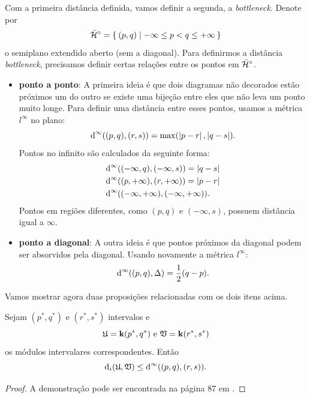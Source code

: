 Com a primeira distância definida, vamos definir a segunda, a \textit{bottleneck}. Denote por 
\begin{equation*}
    \bar{\mathcal{H}}^\circ = \Set{(p,q) | -\infty \leq p < q \leq +\infty}
\end{equation*}
o semiplano extendido aberto (sem a diagonal). Para definirmos a distância \textit{bottleneck},
precisamos definir certas relações entre os pontos em $\bar{\mathcal{H}}^\circ$.  
\begin{itemize}
    \item \textbf{ponto a ponto}: A primeira ideia é que dois diagramas não decorados estão
    próximos um do outro se existe uma bijeção entre eles que não leva um ponto muito longe.
    Para definir uma distância entre esses pontos, usamos a métrica $l^\infty$ no plano:
    \begin{equation*}
        \text{d}^\infty((p,q), (r,s)) = \max(\left\lvert p-r\right\rvert, \left\lvert q-s\right\rvert).
    \end{equation*}
    Pontos no infinito são calculados da seguinte forma:
    \begin{align*}
        &\text{d}^\infty((-\infty, q), (-\infty,s)) = \left\lvert q-s\right\rvert \\
        &\text{d}^\infty((p, +\infty), (r,+\infty)) = \left\lvert p-r\right\rvert \\
        &\text{d}^\infty((-\infty, +\infty), (-\infty, +\infty)).
    \end{align*}
    Pontos em regiões diferentes, como $(p,q)$ e $(-\infty,s)$, possuem distância igual a
    $\infty$.
    \item \textbf{ponto a diagonal}: A outra ideia é que pontos próximos da diagonal podem ser
    absorvidos pela diagonal. Usando novamente a métrica $l^\infty$:
    \begin{equation*}
        \text{d}^\infty((p,q), \Delta) = \frac{1}{2}(q-p).
    \end{equation*}
\end{itemize}

Vamos mostrar agora duas proposições relacionadas com os dois itens acima. 
\begin{propo}\label{teo:int_ineq}
    Sejam $(p^*, q^*)$ e $(r^*, s^*)$ intervalos e 
    \begin{equation*}
        \mathfrak{U} = \mathbf{k}(p^*, q^*) \text{ e } \mathfrak{V} = \mathbf{k}(r^*, s^*)
    \end{equation*}
    os módulos intervalares correspondentes. Então
    \begin{equation*}
        \text{d}_i(\mathfrak{U}, \mathfrak{V}) \leq \text{d}^\infty((p,q), (r,s)).
    \end{equation*}
\end{propo}
\begin{proof}
    A demonstração pode ser encontrada na página $87$ em \cite{Chazal2016}.
\end{proof}

